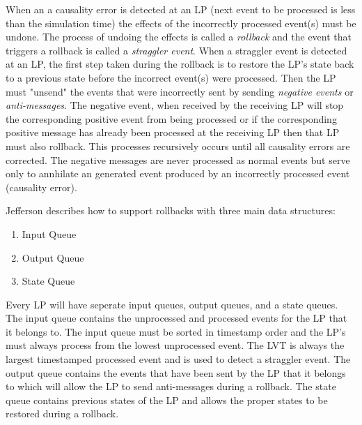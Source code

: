 \documentclass[11pt]{book}
\begin{document}
When an a causality error is detected at an LP (next event to be processed is less than the
simulation time) the effects of the incorrectly processed event(s) must be undone. The process
of undoing the effects is called a \emph{rollback} and the event that triggers a rollback
is called a \emph{straggler event}. When a straggler event is detected at an LP, the first
step taken during the rollback is to restore the LP's state back to a previous state before
the incorrect event(s) were processed. Then the LP must "unsend" the events that were
incorrectly sent by sending \emph{negative events} or \emph{anti-messages}. The negative
event, when received by the receiving LP will stop the corresponding positive event from
being processed or if the corresponding positive message has already been processed at
the receiving LP then that LP must also rollback. This processes recursively occurs until
all causality errors are corrected. The negative messages are never processed as normal
events but serve only to annhilate an generated event produced by an incorrectly processed
event (causality error).

Jefferson\cite{jefferson-85} describes how to support rollbacks with three main data structures:

\begin{enumerate}
    \item Input Queue
    \item Output Queue
    \item State Queue
\end{enumerate}

\noindent
Every LP will have seperate input queues, output queues, and a state queues. The input
queue contains the unprocessed and processed events for the LP that it belongs to. The
input queue must be sorted in timestamp order and the LP's must always process from the
lowest unprocessed event. The LVT is always the largest timestamped processed event and
is used to detect a straggler event. The output queue contains the events that have been
sent by the LP that it belongs to which will allow the LP to send anti-messages during a
rollback. The state queue contains previous states of the LP and allows the proper states
to be restored during a rollback.
\end{document}
